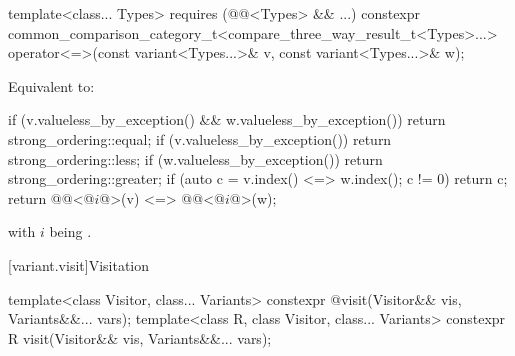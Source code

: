 %
\begin{itemdecl}
template<class... Types> requires (@@<Types> && ...)
  constexpr common_comparison_category_t<compare_three_way_result_t<Types>...>
    operator<=>(const variant<Types...>& v, const variant<Types...>& w);
\end{itemdecl}

\begin{itemdescr}
\pnum
\effects
Equivalent to:
\begin{codeblock}
if (v.valueless_by_exception() && w.valueless_by_exception())
  return strong_ordering::equal;
if (v.valueless_by_exception()) return strong_ordering::less;
if (w.valueless_by_exception()) return strong_ordering::greater;
if (auto c = v.index() <=> w.index(); c != 0) return c;
return @@<@$i$@>(v) <=> @@<@$i$@>(w);
\end{codeblock}
with $i$ being .
\end{itemdescr}

[variant.visit]{Visitation}

%
%
\begin{itemdecl}
template<class Visitor, class... Variants>
  constexpr @\seebelow@ visit(Visitor&& vis, Variants&&... vars);
template<class R, class Visitor, class... Variants>
  constexpr R visit(Visitor&& vis, Variants&&... vars);
\end{itemdecl}

